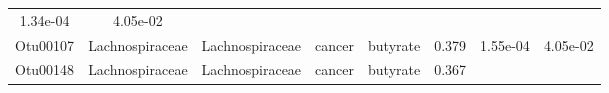 \documentclass[11pt,]{article}
\begin{document}
\begin{longtable}[]{@{}cccccccc@{}}
\begin{minipage}[t]{0.08\columnwidth}
1.34e-04\strut
\end{minipage} & \begin{minipage}[t]{0.08\columnwidth}\centering\strut
4.05e-02\strut
\end{minipage}\tabularnewline
\begin{minipage}[t]{0.08\columnwidth}\centering\strut
Otu00107\strut
\end{minipage} & \begin{minipage}[t]{0.15\columnwidth}\centering\strut
Lachnospiraceae\strut
\end{minipage} & \begin{minipage}[t]{0.15\columnwidth}\centering\strut
Lachnospiraceae\strut
\end{minipage} & \begin{minipage}[t]{0.08\columnwidth}\centering\strut
cancer\strut
\end{minipage} & \begin{minipage}[t]{0.09\columnwidth}\centering\strut
butyrate\strut
\end{minipage} & \begin{minipage}[t]{0.07\columnwidth}\centering\strut
0.379\strut
\end{minipage} & \begin{minipage}[t]{0.08\columnwidth}\centering\strut
1.55e-04\strut
\end{minipage} & \begin{minipage}[t]{0.08\columnwidth}\centering\strut
4.05e-02\strut
\end{minipage}\tabularnewline
\begin{minipage}[t]{0.08\columnwidth}\centering\strut
Otu00148\strut
\end{minipage} & \begin{minipage}[t]{0.15\columnwidth}\centering\strut
Lachnospiraceae\strut
\end{minipage} & \begin{minipage}[t]{0.15\columnwidth}\centering\strut
Lachnospiraceae\strut
\end{minipage} & \begin{minipage}[t]{0.08\columnwidth}\centering\strut
cancer\strut
\end{minipage} & \begin{minipage}[t]{0.09\columnwidth}\centering\strut
butyrate\strut
\end{minipage} & \begin{minipage}[t]{0.07\columnwidth}\centering\strut
0.367\strut
\end{minipage} & \begin{minipage}[t]{0.08\columnwidth}\centering\strut

\end{minipage}
\end{longtable}
\end{document}
